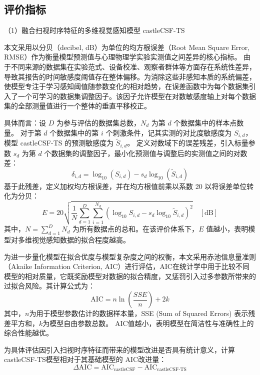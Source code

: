 \label{sec:评价指标} 
\subsection{评价指标}
（1）融合扫视时序特征的多维视觉感知模型 castleCSF-TS

本文采用以分贝（decibel, dB）为单位的均方根误差（Root Mean Square Error, RMSE）作为衡量模型预测值与心理物理学实验实测值之间差异的核心指标。
由于不同来源的数据集在实验范式、设备校准、观察者群体等方面存在系统性差异，导致其报告的时间敏感度阈值存在整体偏移。为消除这些非感知本质的系统偏差，使模型专注于学习感知阈值随参数变化的相对趋势，在误差函数中为每个数据集引入了一个可学习的数据集调整因子。该因子允许模型在对数敏感度轴上对每个数据集的全部测量值进行一个整体的垂直平移校正\cite{1-2-9}。

具体而言：设 $D$ 为参与评估的数据集总数，$N_d$ 为第 $d$ 个数据集中的样本点数量。
对于第 $d$ 个数据集中的第 $i$ 个刺激条件，记其实测的对比度敏感度为 $S_{i,d}$，模型 castleCSF-TS 的预测敏感度为 $\tilde{S}_{i,d}$。
定义对数域下的误差残差，引入标量参数 $s_d$ 为第 $d$ 个数据集的调整因子，最小化预测值与调整后的实测值之间的对数差：
\begin{equation}
\label{eq:sid}
\delta_{i,d} = \log_{10}(S_{i,d}) - s_d \log_{10}(\tilde{S}_{i,d})
\end{equation}
基于此残差，定义加权均方根误差，并在均方根值前乘以系数 20 以将误差单位转化为分贝：
\begin{equation}
\label{eq:rmse_db}
E = 20 \sqrt{ \frac{1}{N} \sum_{d=1}^{D} \sum_{i=1}^{N_d} \left( \log_{10} S_{i,d} - s_d \log_{10} \tilde{S}_{i,d} \right)^2 } \quad [\mathrm{dB}]
\end{equation}
其中，$N = \sum_{d=1}^{D} N_d$ 为所有数据点的总和。在该评价体系下，$E$ 值越小，表明模型对多维视觉感知数据的拟合程度越高。

为进一步量化模型在拟合优度与模型复杂度之间的权衡，本文采用赤池信息量准则（Akaike Information Criterion, AIC）进行评估，AIC在统计学中用于比较不同模型的相对质量，它既奖励模型对数据的拟合精度，又惩罚引入过多参数所带来的过拟合风险。其计算公式为：
\begin{equation}
\label{eq:aic}
\text{AIC} = n \ln\left( \frac{SSE}{n} \right) + 2k
\end{equation}
其中，\(n\)为用于模型参数估计的数据样本量，SSE (Sum of Squared Errors) 表示残差平方和，\(k\)为模型自由参数总数。
AIC值越小，表明模型在简洁性与准确性上的综合性能越优。

为具体评估因引入扫视时序特征而带来的模型改进是否具有统计意义，计算castleCSF-TS模型相对于其基础模型的 AIC改进量：
\begin{equation}
\label{eq:delta_aic}
\Delta \text{AIC} = \text{AIC}_{\text{castleCSF}} - \text{AIC}_{\text{castleCSF-TS}}
\end{equation}

